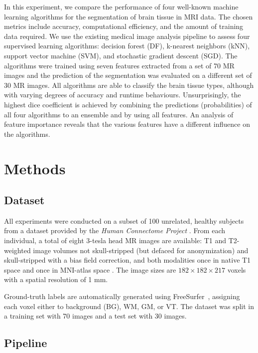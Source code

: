 \documentclass[journal]{IEEEtran}
\begin{document}
In this experiment, we compare the performance of four well-known machine learning algorithms for the segmentation of brain tissue in MRI data. The chosen metrics include accuracy, computational efficiency, and the amount of training data required. We use the existing medical image analysis pipeline to assess four supervised learning algorithms: decision forest (DF), k-nearest neighbors (kNN), support vector machine (SVM), and stochastic gradient descent (SGD). The algorithms were trained using seven features extracted from a set of 70 MR images and the prediction of the segmentation was evaluated on a different set of 30 MR images. All algorithms are able to classify the brain tissue types, although with varying degrees of accuracy and runtime behaviours. Unsurprisingly, the highest dice coefficient is achieved by combining the predictions (probabilities) of all four algorithms to an ensemble and by using all features. An analysis of feature importance reveals that the various features have a different influence on the algorithms.


\section{Methods}

\subsection{Dataset}
All experiments were conducted on a subset of 100 unrelated, healthy subjects from a dataset provided by the \textit{Human Connectome Project} \cite{van2013wu}. From each individual, a total of eight 3-tesla head MR images are available: T1 and T2-weighted image volumes not skull-stripped (but defaced for anonymization) and skull-stripped with a bias field correction, and both modalities once in native T1 space and once in MNI-atlas space \cite{mazziotta2001probabilistic}. The image sizes are $182\times182\times217$ voxels with a spatial resolution of 1 mm.

Ground-truth labels are automatically generated using FreeSurfer~\cite{fischl2012freesurfer}, assigning each voxel either to background (BG), WM, GM, or VT. The dataset was split in a training set with 70 images and a test set with 30 images.

\subsection{Pipeline}\label{s.pipeline}
\end{document}
